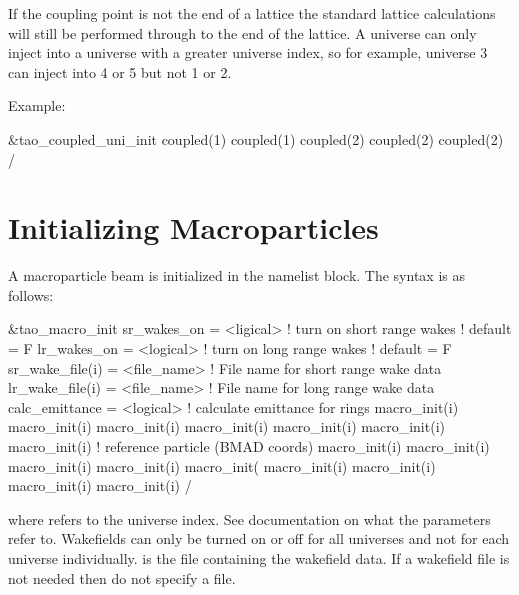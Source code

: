 If the coupling point is not the end of a lattice the standard lattice
calculations will still be performed through to the end of the lattice.
A universe can only inject into a universe with a
greater universe index, so for example, universe 3 can inject into 4 or 5 but
not 1 or 2.

Example:
\begin{example}
  &tao_coupled_uni_init
    coupled(1)%
    coupled(1)%
    coupled(2)%
    coupled(2)%
    coupled(2)%
  /
\end{example}

\section{Initializing Macroparticles}
\label{s:macros}

A macroparticle beam is initialized in the  namelist block.
The syntax is as follows:
\begin{example}
  &tao_macro_init
    sr_wakes_on             = <ligical>   ! turn on short range wakes
                                          ! default = F
    lr_wakes_on             = <logical>   ! turn on long range wakes
                                          ! default = F
    sr_wake_file(i)         = <file_name> ! File name for short range wake data
    lr_wake_file(i)         = <file_name> ! File name for long range wake data
    calc_emittance          = <logical>   ! calculate emittance for rings
    macro_init(i)%
    macro_init(i)%
    macro_init(i)%
    macro_init(i)%
    macro_init(i)%
    macro_init(i)%
    macro_init(i)%
                                         ! reference particle (BMAD coords)
    macro_init(i)%
    macro_init(i)%
    macro_init(i)%
    macro_init(i)%
    macro_init(
    macro_init(i)%
    macro_init(i)%
    macro_init(i)%
    macro_init(i)%
  /
\end{example}
where  refers to the universe index. See \bmad documentation on what the
 parameters refer to. Wakefields can only be turned on or off for all
universes and not for each universe individually.  is the file containing the
wakefield data. If a wakefield file is not needed then do not specify a file.

